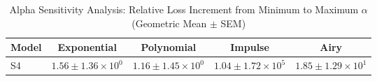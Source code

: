 
\begin{table}[h]
\centering
\caption{Alpha Sensitivity Analysis: Relative Loss Increment from Minimum to Maximum $\alpha$ (Geometric Mean $\pm$ SEM)}
\label{tab:alpha_sensitivity}
\begin{tabular}{lcccc}
\hline
Model & Exponential & Polynomial & Impulse & Airy \\
\hline
S4 & $1.56 \pm 1.36 \times 10^{0}$ & $1.16 \pm 1.45 \times 10^{0}$ & $1.04 \pm 1.72 \times 10^{5}$ & $1.85 \pm 1.29 \times 10^{1}$ \\
\hline
\end{tabular}
\end{table}

